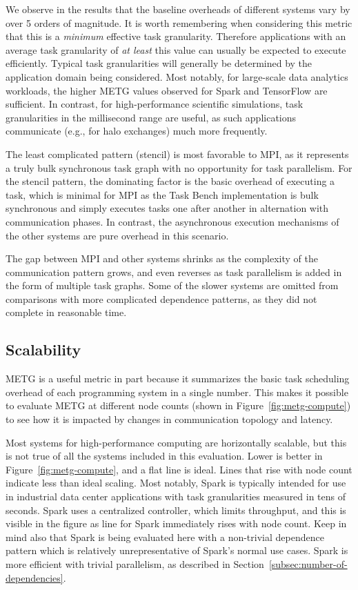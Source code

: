 We observe in the results that the baseline overheads of different
systems vary by over 5 orders of magnitude. It is worth
remembering when considering this metric that this is a \emph{minimum}
effective task granularity. Therefore applications with an average
task granularity of \emph{at least} this value can usually be expected
to execute efficiently. Typical task granularities will
generally be determined by the application domain being
considered. Most notably, for large-scale data analytics workloads, the higher METG values observed for Spark and
TensorFlow are sufficient. In contrast, for high-performance
scientific simulations, task granularities in the millisecond range
are useful, as such applications communicate (e.g., for halo
exchanges) much more frequently.

The least complicated pattern (stencil) is most favorable
to MPI, as it represents a truly bulk synchronous task graph with no
opportunity for task parallelism. For the stencil pattern, the
dominating factor is the basic overhead of executing a task, which is
minimal for MPI as the Task Bench implementation is bulk synchronous
and simply executes tasks one after another in alternation with
communication phases. In contrast, the asynchronous execution
mechanisms of the other systems are pure overhead in this scenario.

The gap between MPI and other systems shrinks as the complexity of the
communication pattern grows, and even reverses as task parallelism is
added in the form of multiple task graphs. Some of the slower systems
are omitted from comparisons with more complicated dependence
patterns, as they did not complete in reasonable time.

\subsection{Scalability}
\label{subsec:scalability}

METG is a useful metric in part because it summarizes the basic task
scheduling overhead of each programming system in a single number. This makes it
possible to evaluate METG at different node counts (shown in
Figure~\ref{fig:metg-compute}) to see how it is impacted by changes in
communication topology and latency.


Most systems for high-performance computing are horizontally scalable,
but this is not true of all the systems included in this
evaluation. Lower is better in Figure~\ref{fig:metg-compute}, and a
flat line is ideal. Lines that rise with node count indicate less than
ideal scaling. Most notably, Spark is typically
intended for use in industrial data center applications with task
granularities measured in tens of seconds. Spark uses a centralized
controller, which limits throughput, and this is visible in the figure
as line for Spark immediately rises with node count. Keep in mind also
that Spark is being evaluated here with a non-trivial dependence
pattern which is relatively unrepresentative of Spark's normal use
cases. Spark is more efficient with trivial parallelism, as described
in Section~\ref{subsec:number-of-dependencies}.

